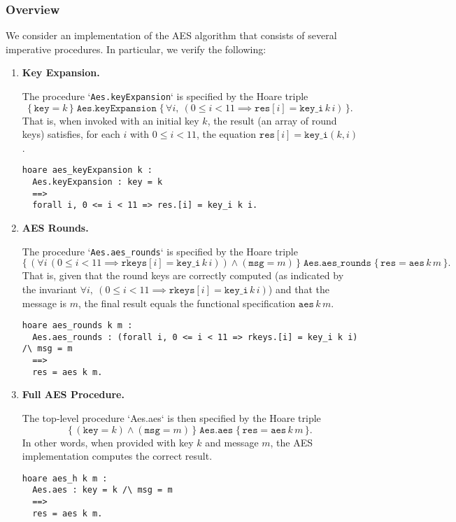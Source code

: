 \subsubsection{Overview}
We consider an implementation of the AES algorithm that consists of several imperative procedures. In particular, we verify the following:
\begin{enumerate}[1.]
	\item \textbf{Key Expansion.}
	
	The procedure `\texttt{Aes.keyExpansion}` is specified by the Hoare triple
	\[
	\{\,\mathtt{key} = k\,\} \; \texttt{Aes.keyExpansion} \; \{\,\forall i,\ (0 \le i < 11 \implies \mathtt{res}[i] = \mathtt{key\_i}\, k\, i) \,\}.
	\]
	That is, when invoked with an initial key \(k\), the result (an array of round keys) satisfies, for each \(i\) with \(0 \le i < 11\), the equation \(\mathtt{res}[i] = \mathtt{key\_i}(k, i)\).
\begin{lstlisting}[style=easycrypt]
hoare aes_keyExpansion k : 
  Aes.keyExpansion : key = k 
  ==> 
  forall i, 0 <= i < 11 => res.[i] = key_i k i.
\end{lstlisting}
	\item \textbf{AES Rounds.} 
	 
	The procedure `\texttt{Aes.aes\_rounds}` is specified by the Hoare triple
	\[
	\{\, (\forall i \, (0 \le i < 11 \implies \mathtt{rkeys}[i] = \mathtt{key\_i}\, k\, i)) \wedge (\mathtt{msg} = m) \,\} \; \texttt{Aes.aes\_rounds} \; \{\, \mathtt{res} = \mathtt{aes}\, k\, m \,\}.
	\]
	That is, given that the round keys are correctly computed (as indicated by the invariant \(\forall i,\ (0 \le i < 11 \implies \mathtt{rkeys}[i] = \mathtt{key\_i}\, k\, i)\)) and that the message is \(m\), the final result equals the functional specification \(\mathtt{aes}\, k\, m\).
\begin{lstlisting}[style=easycrypt]
hoare aes_rounds k m : 
  Aes.aes_rounds : (forall i, 0 <= i < 11 => rkeys.[i] = key_i k i) /\ msg = m 
  ==>
  res = aes k m.
\end{lstlisting}	
	\item \textbf{Full AES Procedure.}
	
	The top‐level procedure `Aes.aes` is then specified by the Hoare triple
	\[
	\{\, (\mathtt{key} = k) \wedge (\mathtt{msg} = m) \,\} \; \texttt{Aes.aes} \; \{\, \mathtt{res} = \mathtt{aes}\, k\, m \,\}.
	\]
	In other words, when provided with key \(k\) and message \(m\), the AES implementation computes the correct result.
\begin{lstlisting}[style=easycrypt]
hoare aes_h k m : 
  Aes.aes : key = k /\ msg = m 
  ==>
  res = aes k m.
\end{lstlisting}	
\end{enumerate}

